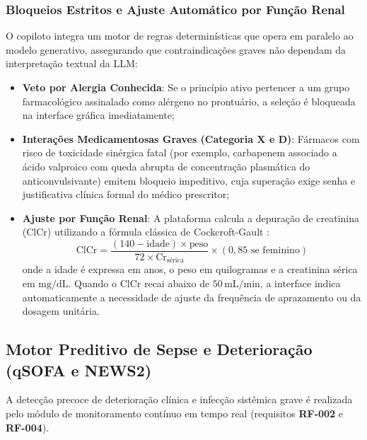 \subsubsection{Bloqueios Estritos e Ajuste Automático por Função Renal}
O copiloto integra um motor de regras determinísticas que opera em paralelo ao modelo generativo, assegurando que contraindicações graves não dependam da interpretação textual da LLM:
\begin{itemize}
    \item \textbf{Veto por Alergia Conhecida}: Se o princípio ativo pertencer a um grupo farmacológico assinalado como alérgeno no prontuário, a seleção é bloqueada na interface gráfica imediatamente;
    \item \textbf{Interações Medicamentosas Graves (Categoria X e D)}: Fármacos com risco de toxicidade sinérgica fatal (por exemplo, carbapenem associado a ácido valproico com queda abrupta de concentração plasmática do anticonvulsivante) emitem bloqueio impeditivo, cuja superação exige senha e justificativa clínica formal do médico prescritor;
    \item \textbf{Ajuste por Função Renal}: A plataforma calcula a depuração de creatinina ($\text{ClCr}$) utilizando a fórmula clássica de Cockcroft-Gault \cite{cockcroft_gault:1976}:
    \begin{equation}
        \text{ClCr} = \frac{(140 - \text{idade}) \times \text{peso}}{72 \times \text{Cr}_{\text{sérica}}} \times (0{,}85 \text{ se feminino})
    \end{equation}
    onde a idade é expressa em anos, o peso em quilogramas e a creatinina sérica em $\text{mg/dL}$. Quando o $\text{ClCr}$ recai abaixo de $50\,\text{mL/min}$, a interface indica automaticamente a necessidade de ajuste da frequência de aprazamento ou da dosagem unitária.
\end{itemize}

\subsection{Motor Preditivo de Sepse e Deterioração (qSOFA e NEWS2)}
\label{subsec:ia_motor_sepse}

A detecção precoce de deterioração clínica e infecção sistêmica grave é realizada pelo módulo de monitoramento contínuo em tempo real (requisitos \textbf{RF-002} e \textbf{RF-004}).

